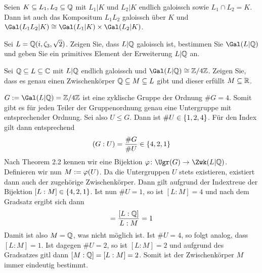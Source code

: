 \begin{exercisePage}
	
	\setcounter{taskcount}{69}
	
	\begin{homework}
		Seien $K \subseteq L_1, L_2 \subseteq \mathbb{Q}$ mit $L_1 | K$ und $L_2 | K$ endlich galoissch sowie $L_1 \cap L_2 = K$. Dann ist auch das Kompositum $L_1 L_2$ galoissch über $K$ und $\Gal(L_1 L_2 | K) \isomorph \Gal(L_1 | K) \times \Gal(L_2 | K)$.
	\end{homework}

	\begin{homework}
		Sei $L = \mathbb{Q}(i, \zeta_3, \sqrt{2})$. Zeigen Sie, dass $L | \mathbb{Q}$ galoissch ist, bestimmen Sie $\Gal(L | \Q)$ und geben Sie ein primitives Element der Erweiterung $L | \mathbb{Q}$ an.
	\end{homework}

	\begin{homework}
		Sei $\mathbb{Q} \subseteq L \subseteq \mathbb{C}$ mit $L | \mathbb{Q}$ endlich galoissch und $\Gal(L | \Q) \isomorph \rest{4}$. Zeigen Sie, dass es genau einen Zwischenkörper $\mathbb{Q} \subseteq M \subseteq L$ gibt und dieser erfüllt $M \subseteq \mathbb{R}$.
	\end{homework}

	$G \defeq \Gal(L | \Q) = \rest{4}$ ist eine zyklische Gruppe der Ordnung $\# G = 4$. Somit gibt es für jeden Teiler der Gruppenordnung genau eine Untergruppe mit entsprechender Ordnung. Sei also $U \le G$. Dann ist $\# U \in \left\{ 1,2,4 \right\}$. Für den Index gilt dann entsprechend 
	\begin{equation*}
		(G : U) = \frac{\# G}{\# U} \in \left\{ 4,2,1 \right\}
	\end{equation*}
	Nach Theorem 2.2 kennen wir eine Bijektion $\abb{\phi}{\Ugr(G)}{\Zwk(L | \Q)}$. Definieren wir nun $M \mathrel{:=} \varphi(U)$. Da die Untergruppen $U$ stets existieren, existiert dann auch der zugehörige Zwischenkörper. Dann gilt aufgrund der Indextreue der Bijektion $[L : M] \in \left\{ 4,2,1 \right\}$. Ist nun $\# U = 1$, so ist $[L : M] = 4$ und nach dem Gradsatz ergibt sich dann
	\begin{equation*}
		[M : \Q] = \frac{[L : \Q]}{L : M} = 1
	\end{equation*}
	Damit ist also $M = \mathbb{Q}$, was nicht möglich ist. Ist $ \# U = 4$, so folgt analog, dass $[L : M] = 1$.
	Ist dagegen $\# U = 2$, so ist $[L : M] = 2$ und aufgrund des Gradsatzes gitl dann $[M : \mathbb{Q}] = [L : M] = 2$. Somit ist der Zwischenkörper $M$ immer eindeutig bestimmt.
	
\end{exercisePage}